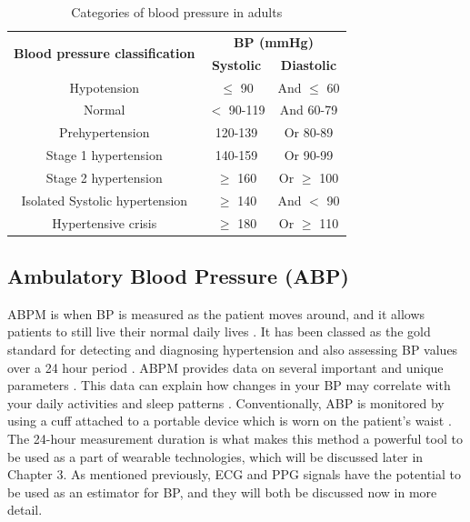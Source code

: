 \documentclass[11pt, a4paper]{article}
\begin{document}
\begin{table}[H]
    \centering
\begin{tabular}{|c|cc|}
\hline
\multirow{2}{*}{\textbf{Blood pressure classification}} & \multicolumn{2}{c|}{\textbf{BP (mmHg)}} \\
 & \textbf{Systolic} & \textbf{Diastolic} \\ \hline
Hypotension & $\le$ 90 & And $\le$ 60 \\
Normal & $\lt$ 90-119 & And 60-79 \\
Prehypertension & 120-139 & Or 80-89 \\
Stage 1 hypertension & 140-159 & Or 90-99 \\
Stage 2 hypertension & $\ge$ 160 & Or $\ge$ 100 \\ 
Isolated Systolic hypertension & $\ge$ 140 & And $<$ 90\\
Hypertensive crisis & $\ge$ 180 & Or $\ge$ 110 \\ \hline
\end{tabular}
\label{bp_vals_table}
\caption{Categories of blood pressure in adults \cite{Wang2018} \cite{Simjanoska20181}}
\end{table}

\subsection{Ambulatory Blood Pressure (ABP)}
ABPM is when BP is measured as the patient moves around, and it allows patients to still live their normal daily lives \cite{Huang2021}. It has been classed as the gold standard for detecting and diagnosing hypertension and also assessing BP values over a 24 hour period \cite{Kario2021}. ABPM provides data on several important and unique parameters \cite{Kario2021}. This data can explain how changes in your BP may correlate with your daily activities and sleep patterns \cite{Huang2021}. Conventionally,  ABP is monitored by using a cuff attached to a portable device which is worn on the patient's waist \cite{Kario2021}. The 24-hour measurement duration is what makes this method a powerful tool to be used as a part of wearable technologies, which will be discussed later in Chapter 3. As mentioned previously, ECG and PPG signals have the potential to be used as an estimator for BP, and they will both be discussed now in more detail.
\end{document}

